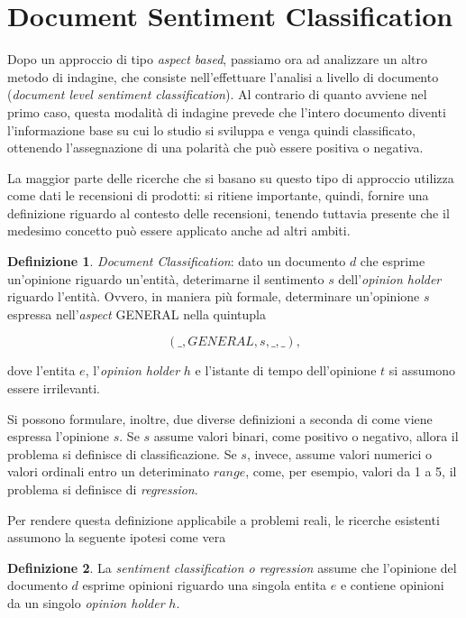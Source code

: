 \documentclass[a4paper,12pt,openright,twoside]{report}
\theoremstyle{definition}
\newtheorem{defi}{Definizione}[section]
\begin{document}
\section{Document Sentiment Classification}
Dopo un approccio di tipo \emph{aspect based}, passiamo ora ad analizzare un altro 
metodo di indagine, che consiste nell'effettuare l'analisi a livello di documento 
(\emph{document level sentiment classification}). 
Al contrario di quanto avviene nel primo caso, questa modalità di indagine prevede che l'intero documento diventi l'informazione base su cui lo studio si sviluppa e venga quindi classificato, ottenendo l'assegnazione di una polarità che può essere positiva o negativa.

La maggior parte delle ricerche che si basano su questo tipo di approccio utilizza come dati le
recensioni di prodotti: si ritiene importante, quindi,
fornire una definizione riguardo al contesto delle recensioni, 
tenendo tuttavia presente che il medesimo concetto può essere applicato anche ad altri ambiti.
\begin{defi} \emph{Document Classification}: dato un documento $d$ che esprime un'opinione riguardo un'entità,
	deterimarne il sentimento $s$ dell'\emph{opinion holder} riguardo l'entità.
	Ovvero, in maniera più formale, determinare un'opinione $s$ espressa nell'\emph{aspect} GENERAL nella quintupla
	
	\begin{equation}
			(\_,GENERAL,s,\_,\_),
		\label{eq:documentSent}
	\end{equation}

	dove l'entita $e$, l'\emph{opinion holder} $h$ e l'istante di tempo dell'opinione
	$t$ si assumono essere irrilevanti.
\end{defi}

Si possono formulare, inoltre, due diverse definizioni a seconda di come viene espressa
l'opinione $s$. Se $s$
assume valori binari, come positivo o negativo, allora il problema si definisce
di classificazione. Se $s$, invece, assume valori numerici o valori ordinali entro un deteriminato
$range$, come, per esempio, valori da 1 a 5, il problema si definisce di \emph{regression}.

Per rendere questa definizione applicabile a problemi reali, le ricerche esistenti
assumono la seguente ipotesi come vera \citep{Liu2010}
\begin{defi} La \emph{sentiment classification o regression} assume che l'opinione
	del documento $d$ esprime opinioni riguardo una singola entita $e$ e 
	contiene opinioni da un singolo \emph{opinion holder} $h$.
\end{defi}
\end{document}
